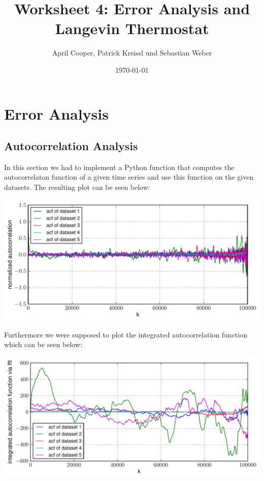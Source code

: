 \documentclass[12pt,a4paper]{scrartcl}
\author{April Cooper, Patrick Kreissl und Sebastian Weber}
\title{Worksheet 4: Error Analysis and Langevin
Thermostat}
\date{\today}
\begin{document}
\maketitle

\section{Error Analysis}
\subsection{Autocorrelation Analysis}
In this section we had to implement a Python function that computes the autocorrelaton function of a given time series and use this function on the given datasets. The resulting plot can be seen below:


\begin{minipage}[hbt]{15cm}
	\centering
	\includegraphics[width=16cm]{../plots/acfplot.pdf}
\end{minipage}

Furthermore we were supposed to plot the integrated autocorrelation function which can be seen below:

\begin{minipage}[hbt]{15cm}
	\centering
	\includegraphics[width=16cm]{../plots/acfintplot.pdf}
\end{minipage}
\end{document}
